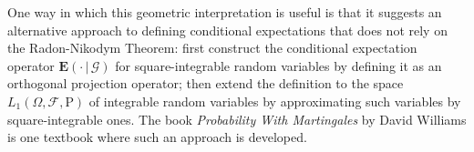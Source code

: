 One way in which this geometric interpretation is
useful is that it suggests an alternative approach to
defining conditional expectations that does not rely
on the Radon-Nikodym Theorem: first construct the
conditional expectation operator
$\mathbf{E}\left(\cdot\,|\,\mathcal{G}\right)$ for
square-integrable random variables by defining it as
an orthogonal projection operator; then extend the
definition to the space
$L_1(\Omega,\mathcal{F},\mathrm{P})$ of integrable
random variables by approximating such variables by
square-integrable ones. The book \emph{Probability With
Martingales} by David Williams is one textbook where
such an approach is developed.
